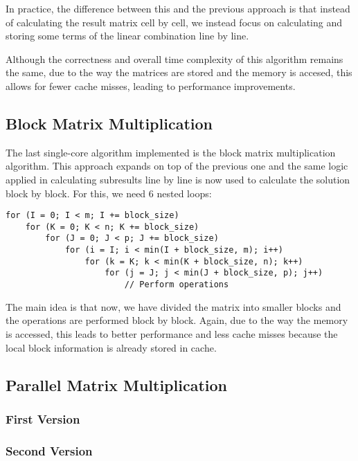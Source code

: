 In practice, the difference between this and the previous approach is that instead of calculating the result matrix cell by cell, we instead focus on calculating and storing some terms of the linear combination line by line.

Although the correctness and overall time complexity of this algorithm remains the same, due to the way the matrices are stored and the memory is accesed, this allows for fewer cache misses, leading to performance improvements.

\subsection{Block Matrix Multiplication}

The last single-core algorithm implemented is the block matrix multiplication algorithm. This approach expands on top of the previous one and the same logic applied in calculating subresults line by line is now used to calculate the solution block by block. For this, we need 6 nested loops:

\begin{verbatim}
for (I = 0; I < m; I += block_size)
    for (K = 0; K < n; K += block_size)
        for (J = 0; J < p; J += block_size)
            for (i = I; i < min(I + block_size, m); i++)
                for (k = K; k < min(K + block_size, n); k++)
                    for (j = J; j < min(J + block_size, p); j++)
                        // Perform operations
\end{verbatim}

The main idea is that now, we have divided the matrix into smaller blocks and the operations are performed block by block. Again, due to the way the memory is accessed, this leads to better performance and less cache misses because the local block information is already stored in cache.

\subsection{Parallel Matrix Multiplication}

\subsubsection{First Version}

\subsubsection{Second Version}

